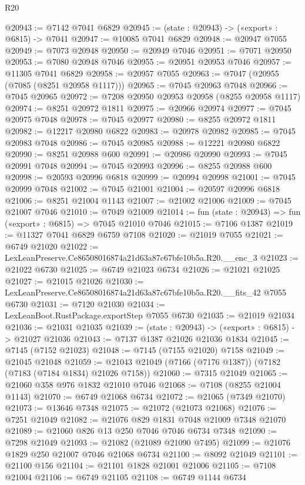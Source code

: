 \begin{lexlean}{R20}
\begin{coremodule}
{@20943 := @7142 @7041 @6829
@20945 := (state : @20943) -> («export» : @6815) -> @7041
@20947 := @10085 @7041 @6829
@20948 := @20947 @7055
@20949 := @7073 @20948
@20950 := @20949 @7046
@20951 := @7071 @20950
@20953 := @7080 @20948 @7046
@20955 := @20951 @20953 @7046
@20957 := @11305 @7041 @6829
@20958 := @20957 @7055
@20963 := @7047 (@20955 (@7085 (@8251 @20958 @1117)))
@20965 := @7045 @20963 @7048
@20966 := @7045 @20965
@20972 := @7208 @20950 @20953 @20958 (@8255 @20958 @1117)
@20974 := @8251 @20972 @1811
@20975 := @20966 @20974
@20977 := @7045 @20975 @7048
@20978 := @7045 @20977
@20980 := @8255 @20972 @1811
@20982 := @12217 @20980 @6822
@20983 := @20978 @20982
@20985 := @7045 @20983 @7048
@20986 := @7045 @20985
@20988 := @12221 @20980 @6822
@20990 := @8251 @20988 @600
@20991 := @20986 @20990
@20993 := @7045 @20991 @7048
@20994 := @7045 @20993
@20996 := @8255 @20988 @600
@20998 := @20593 @20996 @6818
@20999 := @20994 @20998
@21001 := @7045 @20999 @7048
@21002 := @7045 @21001
@21004 := @20597 @20996 @6818
@21006 := @8251 @21004 @1143
@21007 := @21002 @21006
@21009 := @7045 @21007 @7046
@21010 := @7049 @21009
@21014 := fun (state : @20943) => fun («export» : @6815) => @7045 @21010 @7046
@21015 := @7106 @1387
@21019 := @11327 @7041 @6829 @6759 @7108
@21020 := @21019 @7055
@21021 := @6749 @21020
@21022 := LexLeanPreserve.Ce86508016874a21d63a87c67bfe10b5a.R20.__enc_3
@21023 := @21022 @6730
@21025 := @6749 @21023 @6734
@21026 := @21021 @21025
@21027 := @21015 @21026
@21030 := LexLeanPreserve.Ce86508016874a21d63a87c67bfe10b5a.R20.__fits_42 @7055 @6730
@21031 := @7120 @21030
@21034 := LexLeanBoot.RustPackage.exportStep @7055 @6730
@21035 := @21019 @21034
@21036 := @21031 @21035
@21039 := (state : @20943) -> («export» : @6815) -> @21027 @21036
@21043 := @7137 @1387 @21026 @21036 @1834
@21045 := @7145 (@7152 @21023)
@21048 := @7145 (@7155 @21020) @7158
@21049 := @21045 @21048
@21059 := @21043 @21049 (@7166 (@7176 @1387)) (@7182 (@7183 (@7184 @1834) @21026 @7158))
@21060 := @7315 @21049
@21065 := @21060 @358 @976 @1832 @21010 @7046
@21068 := @7108 (@8255 @21004 @1143)
@21070 := @6749 @21068 @6734
@21072 := @21065 (@7349 @21070)
@21073 := @13646 @7348
@21075 := @21072 (@21073 @21068)
@21076 := @7251 @21049
@21082 := @21076 @829 @1831 @7048 @21009 @7348 @21070
@21089 := @21060 @826 @13 @250 @7046 @7046 @6734 @7348
@21090 := @7298 @21049
@21093 := @21082 (@21089 @21090 @7495)
@21099 := @21076 @1829 @250 @21007 @7046 @21068 @6734
@21100 := @8092 @21049
@21101 := @21100 @156
@21104 := @21101 @1828 @21001 @21006
@21105 := @7108 @21004
@21106 := @6749 @21105
@21108 := @6749 @1144 @6734
}
\end{coremodule}
\end{lexlean}
